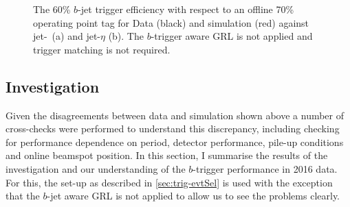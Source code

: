 \begin{figure}[!ht]
  \begin{center}
    \captionsetup[subfigure]{aboveskip=0pt,justification=centering}
  \end{center}
  \caption{The 60\% $b$-jet trigger efficiency with respect to an offline 70\% operating point tag
    for Data (black) and simulation (red) against jet-\pT~(a) and jet-$\eta$ (b).
    The $b$-trigger aware GRL is not applied and trigger matching is not required.}
  \label{fig:trig-Full_noGRL_eff_noHLTMatch}
\end{figure}

\subsection{Investigation}
\label{sec:trig-inv}

Given the disagreements between data and simulation shown above
a number of cross-checks were performed to understand this discrepancy,
including checking for performance dependence on period,
detector performance, pile-up conditions and online beamspot position.
In this section, I summarise the results of the investigation
and our understanding of the $b$-trigger performance in 2016 data.
For this, the set-up as described in \ref{sec:trig-evtSel} is used
with the exception that the $b$-jet aware GRL is not applied to allow us to see the problems clearly.

